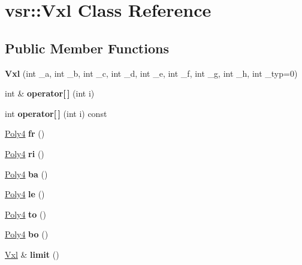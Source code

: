 \hypertarget{classvsr_1_1_vxl}{\section{vsr\-:\-:Vxl Class Reference}
\label{classvsr_1_1_vxl}
}
\subsection*{Public Member Functions}
\begin{DoxyCompactItemize}
\item 
\hypertarget{classvsr_1_1_vxl_a4e7e75b14b05d39dc3597396de6a7970}{{\bfseries Vxl} (int \-\_\-a, int \-\_\-b, int \-\_\-c, int \-\_\-d, int \-\_\-e, int \-\_\-f, int \-\_\-g, int \-\_\-h, int \-\_\-typ=0)}\label{classvsr_1_1_vxl_a4e7e75b14b05d39dc3597396de6a7970}

\item 
\hypertarget{classvsr_1_1_vxl_a71298fe74ed3967b6e7184dae9909f40}{int \& {\bfseries operator\mbox{[}$\,$\mbox{]}} (int i)}\label{classvsr_1_1_vxl_a71298fe74ed3967b6e7184dae9909f40}

\item 
\hypertarget{classvsr_1_1_vxl_ade989bf776f1ba15ef6dccd2f127f0f6}{int {\bfseries operator\mbox{[}$\,$\mbox{]}} (int i) const }\label{classvsr_1_1_vxl_ade989bf776f1ba15ef6dccd2f127f0f6}

\item 
\hypertarget{classvsr_1_1_vxl_a4ffb880a54920511c7f341482caae192}{\hyperlink{structvsr_1_1_poly4}{Poly4} {\bfseries fr} ()}\label{classvsr_1_1_vxl_a4ffb880a54920511c7f341482caae192}

\item 
\hypertarget{classvsr_1_1_vxl_a57cf83a0c1b5080ba0de959a5943f0aa}{\hyperlink{structvsr_1_1_poly4}{Poly4} {\bfseries ri} ()}\label{classvsr_1_1_vxl_a57cf83a0c1b5080ba0de959a5943f0aa}

\item 
\hypertarget{classvsr_1_1_vxl_ac8fcd08643f30162e3fe64293c3fe20b}{\hyperlink{structvsr_1_1_poly4}{Poly4} {\bfseries ba} ()}\label{classvsr_1_1_vxl_ac8fcd08643f30162e3fe64293c3fe20b}

\item 
\hypertarget{classvsr_1_1_vxl_a7344e374d63d0fde26501d546ba6fff4}{\hyperlink{structvsr_1_1_poly4}{Poly4} {\bfseries le} ()}\label{classvsr_1_1_vxl_a7344e374d63d0fde26501d546ba6fff4}

\item 
\hypertarget{classvsr_1_1_vxl_aece4f1925e1fec813c375c56aa0b8e02}{\hyperlink{structvsr_1_1_poly4}{Poly4} {\bfseries to} ()}\label{classvsr_1_1_vxl_aece4f1925e1fec813c375c56aa0b8e02}

\item 
\hypertarget{classvsr_1_1_vxl_a9b4f0f8ad36be25753c4c751f24a229a}{\hyperlink{structvsr_1_1_poly4}{Poly4} {\bfseries bo} ()}\label{classvsr_1_1_vxl_a9b4f0f8ad36be25753c4c751f24a229a}

\item 
\hypertarget{classvsr_1_1_vxl_ac3c270c61c21ba793990d2ed59c13642}{\hyperlink{classvsr_1_1_vxl}{Vxl} \& {\bfseries limit} ()}\label{classvsr_1_1_vxl_ac3c270c61c21ba793990d2ed59c13642}

\end{DoxyCompactItemize}
